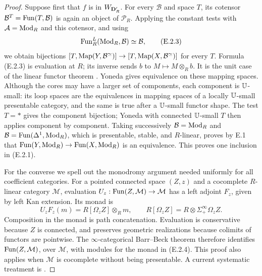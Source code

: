 \begin{proof}
Suppose first that $f$ is in $W_{\mathbf D'_R}$.  For every $\mathcal B$ and
space $T$, its cotensor $\mathcal B^T=\operatorname{Fun}(T,\mathcal B)$ is again an
object of $\mathcal P_R$.  Applying the constant tests with
$\mathcal A=\operatorname{Mod}_R$ and this cotensor, and using
\[
 \operatorname{Fun}_R^L(\operatorname{Mod}_R,\mathcal B)\simeq\mathcal B,
                                                               \tag{E.2.3}
\]
we obtain bijections
$[T,\operatorname{Map}(Y,\mathcal B^{\simeq})]\to
[T,\operatorname{Map}(X,\mathcal B^{\simeq})]$ for every $T$.
Formula (E.2.3) is evaluation at $R$; its inverse sends $b$ to
$M\mapsto M\otimes_R b$.  It is the unit case of the linear functor
theorem \citep[Theorem 4.8.4.1]{EF_LurieHA}.
Yoneda gives equivalence on these mapping spaces.  Although the cores
may have a larger set of components, each component is $\mathbb U$-small:
its loop spaces are the equivalences in mapping spaces of a
locally $\mathbb U$-small presentable category, and the same is true after
a $\mathbb U$-small functor shape.  The test $T=*$ gives the component
bijection; Yoneda with connected $\mathbb U$-small $T$ then applies
component by component.  Taking successively
$\mathcal B=\operatorname{Mod}_R$ and $\mathcal B=\operatorname{Fun}(\Delta^1,\operatorname{Mod}_R)$, which is
presentable, stable, and $R$-linear, proves by E.1 that
$\operatorname{Fun}(Y,\operatorname{Mod}_R)\to\operatorname{Fun}(X,\operatorname{Mod}_R)$ is an equivalence.  This proves one
inclusion in (E.2.1).

For the converse we spell out the monodromy argument needed uniformly
for all coefficient categories.  For a pointed connected space $(Z,z)$
and a cocomplete $R$-linear category $\mathcal M$, evaluation
$U_z:\operatorname{Fun}(Z,\mathcal M)\to\mathcal M$ has a left adjoint $F_z$, given
by left Kan extension.  Its monad is
\[
 U_zF_z(m)=R[\Omega_zZ]\otimes_R m,
 \qquad R[\Omega_zZ]=R\otimes\Sigma^
 {\infty}_{+}\Omega_zZ.                                      \tag{E.2.4}
\]
Composition in the monad is path concatenation.  Evaluation is
conservative because $Z$ is connected, and preserves geometric
realizations because colimits of functors are pointwise.  The
$\infty$-categorical Barr--Beck theorem
\citep[Theorem 4.7.3.5]{EF_LurieHA} therefore identifies
$\operatorname{Fun}(Z,\mathcal M)$, over $\mathcal M$, with modules for the monad
in (E.2.4).  This proof also applies when $\mathcal M$ is cocomplete
without being presentable.  A current systematic treatment is
\citet[Proposition 1.2.7 and Corollary 1.2.8]{EF_PPS2025}.


\end{proof}
